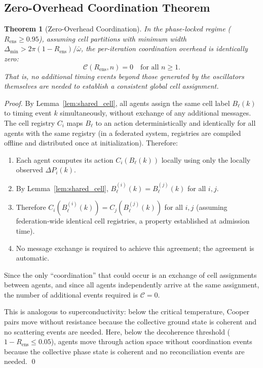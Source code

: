 \documentclass[twocolumn,10pt]{article}
\newtheorem{theorem}{Theorem}[section]
\newcommand{\Rens}{R_{\mathrm{ens}}}
\newcommand{\DeltaP}{\Delta P}
\begin{document}
\subsection{Zero-Overhead Coordination Theorem}

\begin{theorem}[Zero-Overhead Coordination]
\label{thm:zero_overhead}
In the phase-locked regime ($\Rens \geq 0.95$), assuming cell partitions with
minimum width $\Delta_{\min} > 2\pi(1-\Rens)/\bar{\omega}$, the per-iteration
coordination overhead is identically zero:
\[
  \mathcal{C}(\Rens, n) = 0 \quad \text{for all } n \geq 1.
\]
That is, no additional timing events beyond those generated by the oscillators
themselves are needed to establish a consistent global cell assignment.
\end{theorem}

\begin{proof}
By Lemma~\ref{lem:shared_cell}, all agents assign the same cell label
$B_\ell(k)$ to timing event $k$ simultaneously, without exchange of any
additional messages. The cell registry $C_i$ maps $B_\ell$ to an action
deterministically and identically for all agents with the same registry (in a
federated system, registries are compiled offline and distributed once at
initialization). Therefore:

\begin{enumerate}[leftmargin=1em]
\item Each agent computes its action $C_i(B_\ell(k))$ locally using only the
      locally observed $\DeltaP_i(k)$.
\item By Lemma~\ref{lem:shared_cell}, $B_\ell^{(i)}(k) = B_\ell^{(j)}(k)$
      for all $i, j$.
\item Therefore $C_i(B_\ell^{(i)}(k)) = C_j(B_\ell^{(j)}(k))$ for all $i,j$
      (assuming federation-wide identical cell registries, a property
      established at admission time).
\item No message exchange is required to achieve this agreement; the agreement
      is automatic.
\end{enumerate}

Since the only ``coordination'' that could occur is an exchange of cell
assignments between agents, and since all agents independently arrive at the
same assignment, the number of additional events required is $\mathcal{C} = 0$.

This is analogous to superconductivity: below the critical temperature,
Cooper pairs move without resistance because the collective ground state is
coherent and no scattering events are needed. Here, below the decoherence
threshold ($1 - \Rens \leq 0.05$), agents move through action space without
coordination events because the collective phase state is coherent and no
reconciliation events are needed. \qed
\end{proof}
\end{document}
